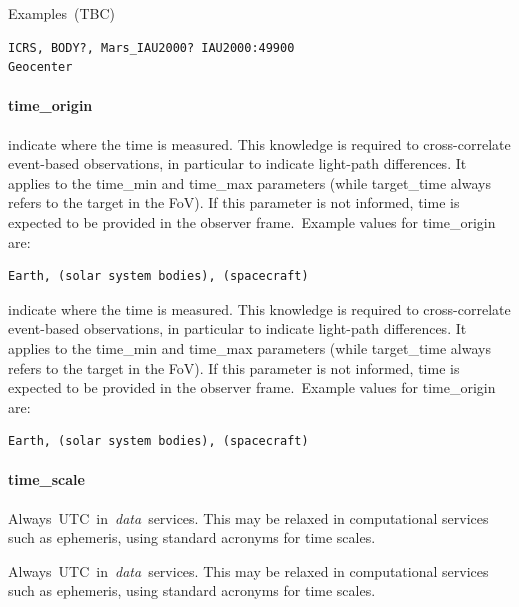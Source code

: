 \documentclass[11pt,a4paper]{ivoa}
\begin{document}
Examples (TBC)






\begin{verbatim}
ICRS, BODY?, Mars_IAU2000? IAU2000:49900
Geocenter
\end{verbatim}




\paragraph{time\_origin}

indicate where the time is measured. This knowledge is required to cross-correlate event-based observations, in particular to indicate light-path differences. It applies to the time\_min and time\_max parameters (while target\_time always refers to the target in the FoV). If this parameter is not informed, time is expected to be provided in the observer frame. Example values for time\_origin are:






\begin{verbatim}
Earth, (solar system bodies), (spacecraft)
\end{verbatim}




indicate where the time is measured. This knowledge is required to cross-correlate event-based observations, in particular to indicate light-path differences. It applies to the time\_min and time\_max parameters (while target\_time always refers to the target in the FoV). If this parameter is not informed, time is expected to be provided in the observer frame. Example values for time\_origin are:






\begin{verbatim}
Earth, (solar system bodies), (spacecraft)
\end{verbatim}




\paragraph{time\_scale}

Always UTC in \emph{data} services. This may be relaxed in computational services such as ephemeris, using standard acronyms for time scales.

Always UTC in \emph{data} services. This may be relaxed in computational services such as ephemeris, using standard acronyms for time scales.
\end{document}

